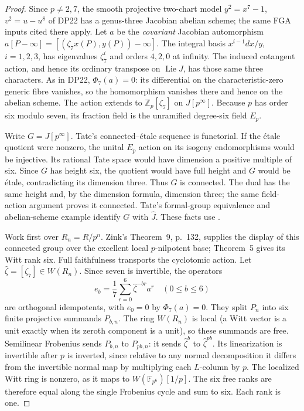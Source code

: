 \documentclass[11pt,a4paper]{article}
\theoremstyle{definition}\newtheorem{remark}[theorem]{Remark}
\newcommand{\Z}{\mathbb Z}\newcommand{\Q}{\mathbb Q}\newcommand{\F}{\mathbb F}
\newcommand{\Lie}{\operatorname{Lie}}\newcommand{\Dist}{\operatorname{Dist}}
\begin{document}
\begin{proof}
Since $p\ne2,7$, the smooth projective two-chart model
$y^2=x^7-1$, $v^2=u-u^8$ of DP22 has a genus-three Jacobian abelian scheme; the same FGA inputs cited there apply.
Let $a$ be the \emph{covariant} Jacobian automorphism
$a[P-\infty]=[(\zeta_7x(P),y(P))-\infty]$.
The integral basis $x^{i-1}dx/y$, $i=1,2,3$, has eigenvalues
$\zeta_7^i$ and orders $4,2,0$ at infinity. The induced cotangent action, and hence its ordinary transpose on $\Lie J$, has those same three characters. As in DP22, $\Phi_7(a)=0$: its differential on the characteristic-zero generic fibre vanishes, so the homomorphism vanishes there and hence on the abelian scheme.
The action extends to $\Z_p[\zeta_7]$ on $J[p^\infty]$.
Because $p$ has order six modulo seven, its fraction field is the unramified degree-six field $E_p$.

Write $G=J[p^\infty]$. Tate's connected--\'etale sequence is functorial.
If the \'etale quotient were nonzero, the unital $E_p$ action on its isogeny endomorphisms would be injective. Its rational Tate space would have dimension a positive multiple of six. Since $G$ has height six, the quotient would have full height and $G$ would be \'etale, contradicting its dimension three.
Thus $G$ is connected. The dual has the same height and, by the dimension formula, dimension three; the same field-action argument proves it connected. Tate's formal-group equivalence and abelian-scheme example identify $G$ with $\widehat J$.
These facts use \cite[\S1.4, p.~160; \S2.1 Example (a), p.~161; \S2.2 Proposition 1 and (4), pp.~162,164; \S2.3 Proposition 3 and Example (b), p.~166]{Tate67}.

Work first over $R_n=R/p^n$. Zink's Theorem~9, p.~132, supplies the display of this connected group over the excellent local $p$-nilpotent base; Theorem~5 gives its Witt rank six. Full faithfulness transports the cyclotomic action.
Let $\widehat\zeta=[\zeta_7]\in W(R_n)$. Since seven is invertible, the operators
\[
 e_b=\frac17\sum_{r=0}^6\widehat\zeta^{-br}a^r
       \quad(0\le b\le6)
\]
are orthogonal idempotents, with $e_0=0$ by $\Phi_7(a)=0$.
They split $P_n$ into six finite projective summands $P_{b,n}$.
The ring $W(R_n)$ is local (a Witt vector is a unit exactly when its zeroth component is a unit), so these summands are free.
Semilinear Frobenius sends $P_{b,n}$ to $P_{pb,n}$: it sends
$\widehat\zeta^b$ to $\widehat\zeta^{pb}$.
Its linearization is invertible after $p$ is inverted, since relative to any normal decomposition it differs from the invertible normal map by multiplying each $L$-column by $p$.
The localized Witt ring is nonzero, as it maps to
$W(\F_{p^6})[1/p]$.
The six free ranks are therefore equal along the single Frobenius cycle and sum to six. Each rank is one.


\end{proof}
\end{document}
